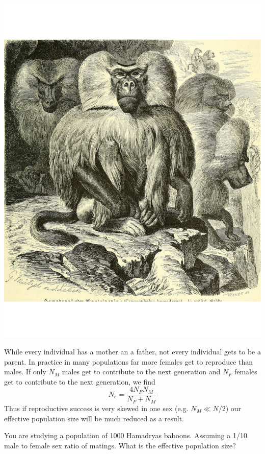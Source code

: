 \begin{marginfigure}
\begin{center}
\includegraphics[width= 0.7 \textwidth]{illustration_images/Genetic_drift/Hamadryas_baboon/Hamadryas_baboon.pdf}
\end{center}
\caption{Male Hamadryas baboons. Brehm's Tierleben. Brehm,
  A.E. 1893. Up to ten females live in a harem with a single male.  %
} \label{fig:Hamadryas_baboon}  
\end{marginfigure} 

While every individual has a mother an a father, not every individual
gets to be a parent. In practice in many populations far more females
get to reproduce than males. If only $N_M$ males get to contribute to the next
generation and $N_F$ females get to contribute to the next
generation, we find
\begin{equation}
N_e = \frac{4N_FN_M}{N_F+N_M}
\end{equation}
Thus if reproductive success is very skewed in one sex (e.g. $N_M \ll
N/2$) our effective population size will be much reduced as a result.\\

\begin{question}
You are studying a population of 1000 Hamadryas baboons. Assuming a
1/10 male to female sex ratio of matings. What is the effective
population size?
 \end{question}

